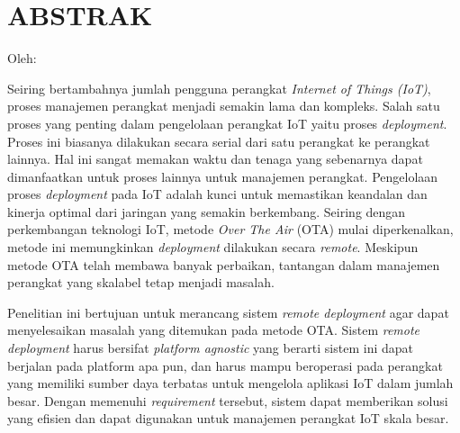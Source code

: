 \clearpage
\chapter*{ABSTRAK}
\begin{center}
  \center
  \begin{singlespace}
    \large\bfseries\MakeUppercase{\thetitle}
    
    \normalfont\normalsize
    Oleh:
    
    \bfseries \theauthor
  \end{singlespace}
\end{center}

\begin{singlespace}
  \small
  Seiring bertambahnya jumlah pengguna perangkat \textit{Internet of Things (IoT)}, proses manajemen perangkat menjadi semakin lama dan kompleks. Salah satu proses yang penting dalam pengelolaan perangkat IoT yaitu proses \textit{deployment}. Proses ini biasanya dilakukan secara serial dari satu perangkat ke perangkat lainnya. Hal ini sangat memakan waktu dan tenaga yang sebenarnya dapat dimanfaatkan untuk proses lainnya untuk manajemen perangkat. Pengelolaan proses \textit{deployment} pada IoT adalah kunci untuk memastikan keandalan dan kinerja optimal dari jaringan yang semakin berkembang. Seiring dengan perkembangan teknologi IoT, metode \textit{Over The Air} (OTA) mulai diperkenalkan, metode ini memungkinkan \textit{deployment} dilakukan secara \textit{remote}. Meskipun metode OTA telah membawa banyak perbaikan, tantangan dalam manajemen perangkat yang skalabel tetap menjadi masalah.
  
  Penelitian ini bertujuan untuk merancang sistem \textit{remote deployment} agar dapat menyelesaikan masalah yang ditemukan pada metode OTA. Sistem \textit{remote deployment} harus bersifat \textit{platform agnostic} yang berarti sistem ini dapat berjalan pada platform apa pun, dan harus mampu beroperasi pada perangkat yang memiliki sumber daya terbatas untuk mengelola aplikasi IoT dalam jumlah besar. Dengan memenuhi \textit{requirement} tersebut, sistem dapat memberikan solusi yang efisien dan dapat digunakan untuk manajemen perangkat IoT skala besar.
  

\end{singlespace}
